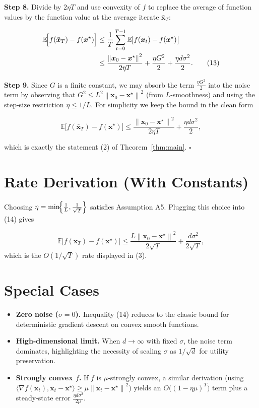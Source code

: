 \documentclass{article}
\newcommand{\E}{\mathbb{E}}
\newcommand{\norm}[1]{\left\|#1\right\|}
\newcommand{\inner}[2]{\langle #1,#2\rangle}
\newcommand{\grad}{\nabla}
\begin{document}
\noindent\textbf{Step 8.}  Divide by $2\eta T$ and use convexity of $f$ to replace the average of function values by the function value at the average iterate $\bar{\bm{x}}_T$:

\[
\begin{aligned}
\E\!\Bigl[f(\bar{\bm{x}}_T)-f(\bm{x}^{\star})\Bigr]
&\le \frac{1}{T}\sum_{t=0}^{T-1}\E\!\bigl[f(\bm{x}_t)-f(\bm{x}^{\star})\bigr]\\
&\le \frac{\norm{\bm{x}_{0}-\bm{x}^{\star}}^{2}}{2\eta T}
   +\frac{\eta G^{2}}{2}
   +\frac{\eta d\sigma^{2}}{2}.
\tag{13}
\end{aligned}
\]

\noindent\textbf{Step 9.}  Since $G$ is a finite constant, we may absorb the term $\frac{\eta G^{2}}{2}$ into the noise term by observing that $G^{2}\le L^{2}\norm{\bm{x}_{0}-\bm{x}^{\star}}^{2}$ (from $L$‑smoothness) and using the step‑size restriction $\eta\le 1/L$. For simplicity we keep the bound in the clean form

\[
\E\!\bigl[f(\bar{\bm{x}}_T)-f(\bm{x}^{\star})\bigr]
\le \frac{\norm{\bm{x}_{0}-\bm{x}^{\star}}^{2}}{2\eta T}
   +\frac{\eta d\sigma^{2}}{2},
\tag{14}
\]

which is exactly the statement (2) of Theorem~\ref{thm:main}. \hfill $\square$

\section*{Rate Derivation (With Constants)}
Choosing $\eta = \min\!\Bigl\{\frac{1}{L},\frac{1}{\sqrt{T}}\Bigr\}$ satisfies Assumption A5.
Plugging this choice into (14) gives

\[
\E\!\bigl[f(\bar{\bm{x}}_T)-f(\bm{x}^{\star})\bigr]
\le \frac{L\norm{\bm{x}_{0}-\bm{x}^{\star}}^{2}}{2\sqrt{T}}
   +\frac{d\sigma^{2}}{2\sqrt{T}},
\tag{15}
\]
which is the $O(1/\sqrt{T})$ rate displayed in (3).

\section*{Special Cases}
\begin{itemize}[noitemsep]
\item \textbf{Zero noise ($\sigma=0$).} Inequality (14) reduces to the classic bound for deterministic gradient descent on convex smooth functions.
\item \textbf{High‑dimensional limit.} When $d\to\infty$ with fixed $\sigma$, the noise term dominates, highlighting the necessity of scaling $\sigma$ as $1/\sqrt{d}$ for utility preservation.
\item \textbf{Strongly convex $f$.} If $f$ is $\mu$‑strongly convex, a similar derivation (using $\inner{\grad f(\bm{x}_t)}{\bm{x}_t-\bm{x}^{\star}}\ge \mu\norm{\bm{x}_t-\bm{x}^{\star}}^{2}$) yields an $O\!\bigl((1-\eta\mu)^{T}\bigr)$ term plus a steady‑state error $\frac{\eta d\sigma^{2}}{2\mu}$.
\end{itemize}
\end{document}
